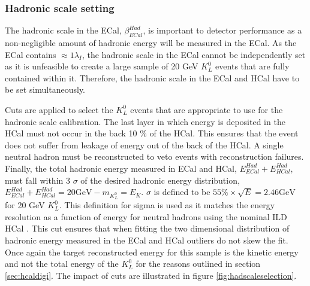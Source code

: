 
\subsubsection{Hadronic scale setting}
\label{sec:hadscalesetting}
The hadronic scale in the ECal, $\beta^{Had}_{ECal}$, is important to detector performance as a non-negligible amount of hadronic energy will be measured in the ECal.  As the ECal contains $\approx 1 \lambda_{I}$, the hadronic scale in the ECal cannot be independently set as it is unfeasible to create a large sample of 20 GeV $K^{0}_{L}$ events that are fully contained within it.  Therefore, the hadronic scale in the ECal and HCal have to be set simultaneously.  

Cuts are applied to select the $K^{0}_{L}$ events that are appropriate to use for the hadronic scale calibration.  The last layer in which energy is deposited in the HCal must not occur in the back 10 \% of the HCal.  This ensures that the event does not suffer from leakage of energy out of the back of the HCal.  A single neutral hadron must be reconstructed to veto events with reconstruction failures.  Finally, the total hadronic energy measured in ECal and HCal, $E^{Had}_{ECal} + E^{Had}_{HCal}$, must fall within 3 $\sigma$ of the desired hadronic energy distribution, $E^{Had}_{ECal} + E^{Had}_{HCal} = 20 \text {GeV} - m_{K^{0}_{L}} = E_{K}$.  $\sigma$ is defined to be $55\% \times \sqrt{E} = 2.46 \text{GeV}$ for 20 GeV $K^{0}_{L}$.  This definition for sigma is used as it matches the energy resolution as a function of energy for neutral hadrons using the nominal ILD HCal \cite{Behnke:2013lya}.  This cut ensures that when fitting the two dimensional distribution of hadronic energy measured in the ECal and HCal outliers do not skew the fit.  Once again the target reconstructed energy for this sample is the kinetic energy and not the total energy of the $K^{0}_{L}$ for the reasons outlined in section \ref{sec:hcaldigi}.  The impact of cuts are illustrated in figure \ref{fig:hadscaleselection}.

